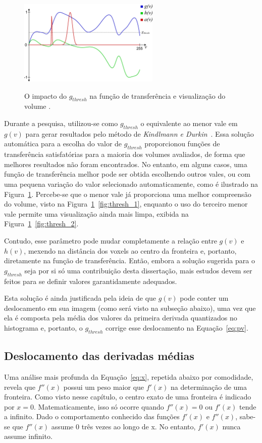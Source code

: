 \begin{figure}[t]
{		\includegraphics[width=0.6\textwidth]{images/g_bonsai_ft}
		\label{fig:thresh_2}
	}
	\caption{O impacto do $g_{thresh}$ na função de transferência e visualização do volume .}
	\label{fig:g_thresh}
\end{figure}

	Durante a pesquisa, utilizou-se como $ g_{thresh} $ o equivalente ao menor vale em $ g(v) $ para gerar resultados pelo método de \textit{Kindlmann e Durkin}~\cite{gordon}. Essa solução automática para a escolha do valor de $ g_{thresh} $ proporcionou funções de transferência satisfatórias para a maioria dos volumes avaliados, de forma que melhores resultados não foram encontrados. No entanto, em alguns casos, uma função de transferência melhor pode ser obtida escolhendo outros vales, ou com uma pequena variação do valor selecionado automaticamente, como é ilustrado na Figura~\ref{fig:g_thresh}. Percebe-se que o menor vale já proporciona uma melhor compreensão do volume, visto na Figura~\ref{fig:g_thresh}~\ref{fig:thresh_1}, enquanto o uso do terceiro menor vale permite uma visualização ainda mais limpa, exibida na Figura~\ref{fig:g_thresh}~\ref{fig:thresh_2}.
	
	Contudo, esse parâmetro pode mudar completamente a relação entre $ g(v) $ e $ h(v) $, mexendo na distância dos voxels ao centro da fronteira e, portanto, diretamente na função de transferência. Então, embora a solução sugerida para o $ g_{thresh} $ seja por si só uma contribuição desta dissertação, mais estudos devem ser feitos para se definir valores garantidamente adequados.
	
	Esta solução é ainda justificada pela ideia de que $ g(v) $ pode conter um deslocamento em sua imagem (como será visto na subseção abaixo), uma vez que ela é composta pela média dos valores da primeira derivada quantizados no histograma e, portanto, o $ g_{thresh} $ corrige esse deslocamento na Equação~\eqref{eq:pv}.
	
\subsection{Deslocamento das derivadas médias}
    Uma análise mais profunda da Equação~\eqref{eq:x}, repetida abaixo por comodidade, revela que $ f''(x) $ possui um peso maior que $ f'(x) $ na determinação de uma fronteira. Como visto nesse capítulo, o centro exato de uma fronteira é indicado por $ x = 0 $. Matematicamente, isso só ocorre quando $ f''(x) = 0 $ ou $ f'(x) $ tende a infinito. Dado o comportamento conhecido das funções $ f'(x) $ e $ f''(x) $, sabe-se que $ f''(x) $ assume $ 0 $ três vezes ao longo de x. No entanto, $ f'(x) $ nunca assume infinito.
    
